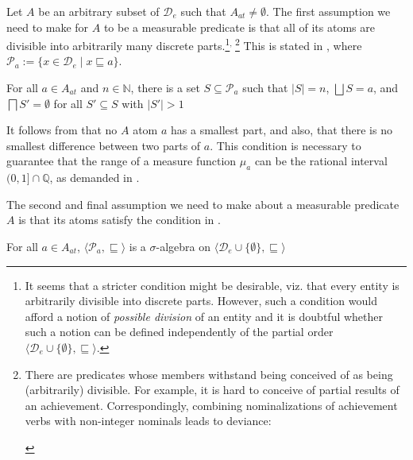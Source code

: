 \documentclass[output=paper]{langscibook}
\begin{document}
Let $A$ be an arbitrary subset of $\mathcal{D}_e$ such that $A_{at}\ne\emptyset$. The first assumption we need to make for $A$ to be a measurable predicate is that all of its atoms are divisible into arbitrarily many discrete parts.\footnote{It seems that a stricter condition might be desirable, viz. that every entity is arbitrarily divisible into discrete parts. However, such a condition would afford a notion of \textit{possible division} of an entity and it is doubtful whether such a notion can be defined independently of the partial order $\langle{\mathcal D}_e\cup\{\emptyset\},\sqsubseteq\rangle$.}$^{\text{, }}$\footnote{\label{hai-tri:fn:indivisible}There are predicates whose members withstand being conceived of as being (arbitrarily) divisible. For example, it is hard to conceive of partial results of an achievement. Correspondingly, combining nominalizations of achievement verbs with non-integer nominals leads to deviance:

\ea \label{hai-tri:ex:deviant}
\z
\z 
} This is stated in , where ${\mathcal P}_a := \{x\in{\mathcal D}_e\mid x\sqsubseteq a\}$.

\ea For all $a \in A_{at}$ and $n\in\mathbb{N}$, there is a set $S \subseteq {\mathcal P}_a$ such that $|S|=n$, $\bigsqcup S=a$, and $\bigsqcap S'=\emptyset$ for all $S'\subseteq S$ with $|S'|>1$
\label{hai-tri:divisible}
\z

\noindent  It follows from  that no $A$ atom $a$ has a smallest part, and also, that there is no smallest difference between two parts of $a$. This condition is necessary to guarantee that the range of a measure function $\mu_a$ can be the rational interval $(0,1]\cap\mathbb{Q}$, as demanded in .

The second and final assumption we need to make about a measurable predicate $A$ is that its atoms satisfy the condition in .

\ea \label{hai-tri:sigma-alg}
For all $a \in A_{at}$, $\langle{\mathcal P}_a,\sqsubseteq\rangle$ is a $\sigma$-algebra on $\langle{\mathcal D}_e\cup\{\emptyset\},\sqsubseteq\rangle$\footnotemark
\z
%
\end{document}
